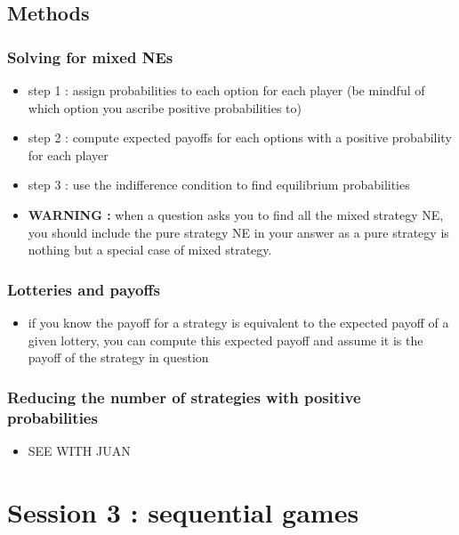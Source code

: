 \documentclass{article}
\begin{document}
\subsection{Methods}

\subsubsection{Solving for mixed NEs}
\begin{itemize}
    \item step 1 : assign probabilities to each option for each player (be mindful of which option you ascribe positive probabilities to)
    \item step 2 : compute expected payoffs for each options with a positive probability for each player
    \item step 3 : use the indifference condition to find equilibrium probabilities 
    \item \textbf{WARNING : }when a question asks you to find all the mixed strategy NE, you should include the pure strategy NE in your answer as a pure strategy is nothing but a special case of mixed strategy. 
\end{itemize}

\subsubsection{Lotteries and payoffs}
\begin{itemize}
    \item if you know the payoff for a strategy is equivalent to the expected payoff of a given lottery, you can compute this expected payoff and assume it is the payoff of the strategy in question
\end{itemize}

\subsubsection{Reducing the number of strategies with positive probabilities}
\begin{itemize}
    \item SEE WITH JUAN
\end{itemize}






\section{Session 3 : sequential games}
\end{document}
